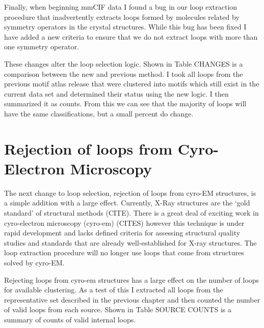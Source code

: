 Finally, when beginning mmCIF data I found a bug in our loop extraction
procedure that inadvertently extracts loops formed by molecules related by
symmetry operators in the crystal structures. While this bug has been fixed I
have added a new criteria to ensure that we do not extract loops with more than
one symmetry operator. 

These changes alter the loop selection logic. Shown in Table CHANGES is a
comparison between the new and previous method. I took all loops from the
previous motif atlas release that were clustered into motifs which still exist
in the current data set and determined their status using the new logic. I then
summarized it as counts. From this we can see that the majority of loops will
have the same classifications, but a small percent do change.

\begin{table}
  \begin{tabular}
  \end{tabular}
  \caption{A table showing the numbers of loops affected by the changes to the
    selection procedure to address incomplete or flawed loop data or models.
  This uses loops from motif release 1.18 compared to NR release 2.92}
  \label{tab:loop-quality-changes}
\end{table}

\section{Rejection of loops from Cyro-Electron Microscopy}

The next change to loop selection, rejection of loops from cyro-EM structures,
is a simple addition with a large effect. Currently, X-Ray structures are the
‘gold standard’ of structural methods (CITE). There is a great deal of exciting
work in cyro-electron microscopy (cyro-em) (CITES) however this technique is
under rapid development and lacks defined criteria for assessing structural
quality studies and standards that are already well-established for X-ray
structures. The loop extraction procedure will no longer use loops that come
from structures solved by cyro-EM. 

Rejecting loops from cyro-em structures has a large effect on the number of
loops for available clustering. As a test of this I extracted all loops from the
representative set described in the previous chapter and then counted the number
of valid loops from each source.  Shown in Table SOURCE COUNTS is a summary of
counts of valid internal loops. 


